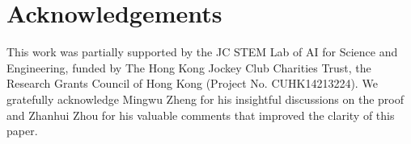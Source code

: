 \section*{Acknowledgements}
This work was partially supported by the JC STEM Lab of AI for Science and Engineering, funded by The Hong Kong Jockey Club Charities Trust, the Research Grants Council of Hong Kong (Project No. CUHK14213224).
We gratefully acknowledge Mingwu Zheng for his insightful discussions on the proof and Zhanhui Zhou for his valuable comments that improved the clarity of this paper.



